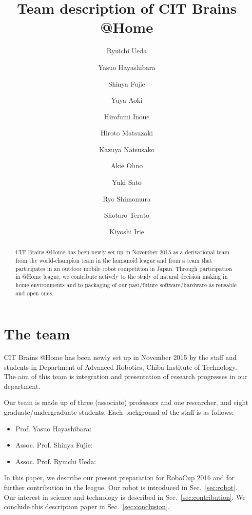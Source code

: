 \documentclass{llncs}
\begin{document}
\title{Team description of CIT Brains @Home}

\author{Ryuichi Ueda \and
Yasuo Hayashibara \and
Shinya Fujie \and
Yuya Aoki \and
Hirofumi Inoue \and
Hiroto Matsuzaki \and
Kazuya Natsusako \and
Akie Ohno \and
Yuki Sato \and
Ryo Shimomura \and
Shotaro Terato \and
Kiyoshi Irie
}


\maketitle
%
\begin{abstract}
CIT Brains @Home has been newly set up in November 2015
as a derivational team from the world-champion team
in the humanoid league and from a team that participates in
an outdoor mobile robot competition in Japan.
Through participation in @Home league,
we contribute actively to the study of natural decision making
in home environments and to packaging of our past/future
software/hardware as reusable and open ones.
\end{abstract}

\section{The team}

CIT Brains @Home has been newly set up in November 2015
by the staff and students in Department of Advanced Robotics,
Chiba Institute of Technology.
The aim of this team is integration and presentation
of research progresses in our department.

Our team is made up of three (associate) professors and
one researcher, and eight graduate/undergraduate students.
Each background of the staff is as follows:
\begin{itemize}
	\item Prof. Yasuo Hayashibara: 
	\item Assoc. Prof. Shinya Fujie: 
	\item Assoc. Prof. Ryuichi Ueda: 
\end{itemize}

In this paper, we describe our present preparation for
RoboCup 2016 and for further contribution in the league.
Our robot is introduced in Sec.~\ref{sec:robot}.
Our interest in science and technology is
described in Sec.~\ref{sec:contribution}.
We conclude this description paper in Sec.~\ref{sec:conclusion}.
\end{document}
